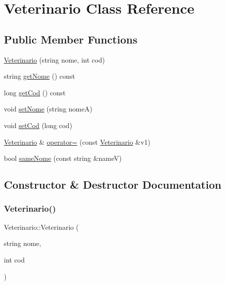 \hypertarget{class_veterinario}{}\section{Veterinario Class Reference}
\label{class_veterinario}
\subsection*{Public Member Functions}
\begin{DoxyCompactItemize}
\item 
\mbox{\hyperlink{class_veterinario_a3e9231bc7e5155e806e10d74679a1bb6}{Veterinario}} (string nome, int cod)
\item 
string \mbox{\hyperlink{class_veterinario_a9002a8335b132d105919e4943c52646c}{get\+Nome}} () const
\item 
long \mbox{\hyperlink{class_veterinario_a6af0a26c205f86f9a8d54abde4030658}{get\+Cod}} () const
\item 
void \mbox{\hyperlink{class_veterinario_a17ee089a0350218bda6d8f258c17b11c}{set\+Nome}} (string nomeA)
\item 
void \mbox{\hyperlink{class_veterinario_a8566b2b3e95477bd963977c885eb8f58}{set\+Cod}} (long cod)
\item 
\mbox{\hyperlink{class_veterinario}{Veterinario}} \& \mbox{\hyperlink{class_veterinario_a3ff7bf618506bbfeb28971d85fadc26d}{operator=}} (const \mbox{\hyperlink{class_veterinario}{Veterinario}} \&v1)
\item 
bool \mbox{\hyperlink{class_veterinario_a90920e323e0b3c1a7872af0ebdb66cb3}{same\+Nome}} (const string \&nameV)
\end{DoxyCompactItemize}


\subsection{Constructor \& Destructor Documentation}
\mbox{\label{class_veterinario_a3e9231bc7e5155e806e10d74679a1bb6}} 
\subsubsection{\texorpdfstring{Veterinario()}{Veterinario()}}
{\footnotesize\ttfamily Veterinario\+::\+Veterinario (\begin{DoxyParamCaption}\item[{string}]{nome,  }\item[{int}]{cod }\end{DoxyParamCaption})}

